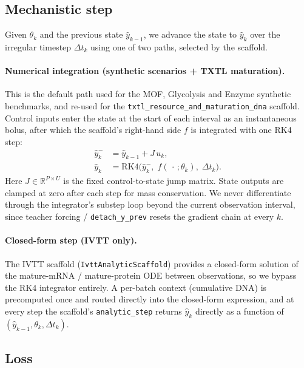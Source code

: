 \subsection{Mechanistic step}
\label{app:step}

Given $\theta_k$ and the previous state $\hat{y}_{k-1}$, we advance the
state to $\hat{y}_k$ over the irregular timestep $\Delta t_k$ using one of
two paths, selected by the scaffold.

\paragraph{Numerical integration (synthetic scenarios + TXTL maturation).}
This is the default path used for the MOF, Glycolysis and Enzyme synthetic
benchmarks, and re-used for the
\texttt{txtl\_resource\_and\_maturation\_dna} scaffold. Control inputs enter
the state at the start of each interval as an instantaneous bolus, after
which the scaffold's right-hand side $f$ is integrated with one RK4 step:
\begin{align}
\hat{y}_k^{-} &= \hat{y}_{k-1} + J\,u_k, \\
\hat{y}_k     &= \mathrm{RK4}\!\big(\hat{y}_k^{-},\; f(\,\cdot\,;\theta_k),\; \Delta t_k\big).
\end{align}
Here $J\!\in\!\mathbb{R}^{P\times U}$ is the fixed control-to-state jump
matrix. State outputs are clamped at zero after each step for mass
conservation. We never differentiate through the integrator's substep loop
beyond the current observation interval, since teacher forcing /
\texttt{detach\_y\_prev} resets the gradient chain at every $k$.

\paragraph{Closed-form step (IVTT only).}  The IVTT scaffold
(\texttt{IvttAnalyticScaffold}) provides a closed-form solution of the
mature-mRNA / mature-protein ODE between observations, so we bypass the RK4
integrator entirely. A per-batch context (cumulative DNA) is precomputed
once and routed directly into the closed-form expression, and at every
step the scaffold's \texttt{analytic\_step} returns $\hat{y}_k$ directly as
a function of $(\hat{y}_{k-1}, \theta_k, \Delta t_k)$.

\subsection{Loss}
\label{app:loss}

